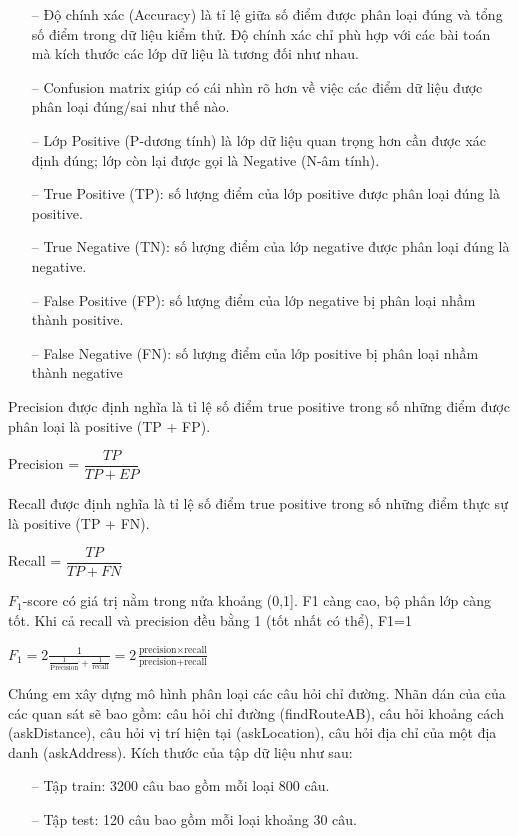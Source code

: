 \begin{itemize}
    \item[--] Độ chính xác (Accuracy) là tỉ lệ giữa số điểm được phân loại đúng và tổng số điểm trong dữ liệu kiểm thử. Độ chính xác chỉ phù hợp với các bài toán mà kích thước các lớp dữ liệu là tương đối như nhau.
    \item[--] Confusion matrix giúp có cái nhìn rõ hơn về việc các điểm dữ liệu được phân loại đúng/sai như thế nào.
    \item[--] Lớp Positive (P-dương tính) là lớp dữ liệu quan trọng hơn cần được xác định đúng; lớp còn lại được gọi là Negative (N-âm tính).
    \item[--] True Positive (TP): số lượng điểm của lớp positive được phân loại đúng là positive.
    \item[--] True Negative (TN): số lượng điểm của lớp negative được phân loại đúng là negative.
    \item[--] False Positive (FP): số lượng điểm của lớp negative bị phân loại nhầm thành positive.
    \item[--] False Negative (FN): số lượng điểm của lớp positive bị phân loại nhầm thành negative
\end{itemize}

Precision được định nghĩa là tỉ lệ số điểm true positive trong số những điểm được phân loại là positive (TP + FP).
\begin{center}
    Precision = $\dfrac{TP}{TP+EP}$
\end{center}

Recall được định nghĩa là tỉ lệ số điểm true positive trong số những điểm thực sự là positive (TP + FN).
\begin{center}
    Recall = $\dfrac{TP}{TP+FN}$
\end{center}

$F_{1}$-score có giá trị nằm trong nửa khoảng (0,1]. F1 càng cao, bộ phân lớp càng tốt. Khi cả recall và precision đều bằng 1 (tốt nhất có thể), F1=1
\begin{center}
    $F_{1}=2\frac{1}{\frac{1}{\text{Precision}} + \frac{1}{\text{recall}}}= 2\frac{\text{precision} \times \text{recall}}{\text{precision} + \text{recall}}$
\end{center}

Chúng em xây dựng mô hình phân loại các câu hỏi chỉ đường. Nhãn dán của của các quan sát sẽ bao gồm: câu hỏi chỉ đường (findRouteAB), câu hỏi khoảng cách (askDistance), câu hỏi vị trí hiện tại (askLocation), câu hỏi địa chỉ của một địa danh (askAddress). Kích thước của tập dữ liệu như sau:
\begin{itemize}
    \item[--] Tập train: 3200 câu bao gồm mỗi loại 800 câu.
    \item[--] Tập test: 120 câu bao gồm mỗi loại khoảng 30 câu.
\end{itemize}

